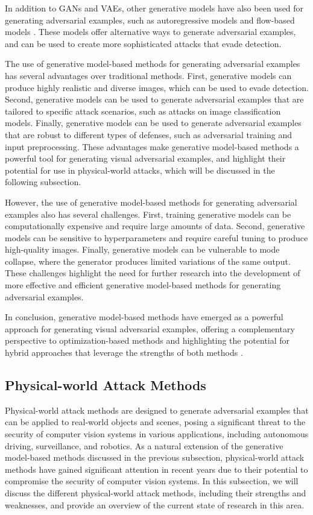 \documentclass[11pt]{article}
\begin{document}
In addition to GANs and VAEs, other generative models have also been used for generating adversarial examples, such as autoregressive models \cite{ref69} and flow-based models \cite{ref70}. These models offer alternative ways to generate adversarial examples, and can be used to create more sophisticated attacks that evade detection.

The use of generative model-based methods for generating adversarial examples has several advantages over traditional methods. First, generative models can produce highly realistic and diverse images, which can be used to evade detection. Second, generative models can be used to generate adversarial examples that are tailored to specific attack scenarios, such as attacks on image classification models. Finally, generative models can be used to generate adversarial examples that are robust to different types of defenses, such as adversarial training and input preprocessing. These advantages make generative model-based methods a powerful tool for generating visual adversarial examples, and highlight their potential for use in physical-world attacks, which will be discussed in the following subsection.

However, the use of generative model-based methods for generating adversarial examples also has several challenges. First, training generative models can be computationally expensive and require large amounts of data. Second, generative models can be sensitive to hyperparameters and require careful tuning to produce high-quality images. Finally, generative models can be vulnerable to mode collapse, where the generator produces limited variations of the same output. These challenges highlight the need for further research into the development of more effective and efficient generative model-based methods for generating adversarial examples.

In conclusion, generative model-based methods have emerged as a powerful approach for generating visual adversarial examples, offering a complementary perspective to optimization-based methods and highlighting the potential for hybrid approaches that leverage the strengths of both methods \cite{ref71}.

\subsection{Physical-world Attack Methods}

Physical-world attack methods are designed to generate adversarial examples that can be applied to real-world objects and scenes, posing a significant threat to the security of computer vision systems in various applications, including autonomous driving, surveillance, and robotics. As a natural extension of the generative model-based methods discussed in the previous subsection, physical-world attack methods have gained significant attention in recent years due to their potential to compromise the security of computer vision systems. In this subsection, we will discuss the different physical-world attack methods, including their strengths and weaknesses, and provide an overview of the current state of research in this area.
\end{document}
